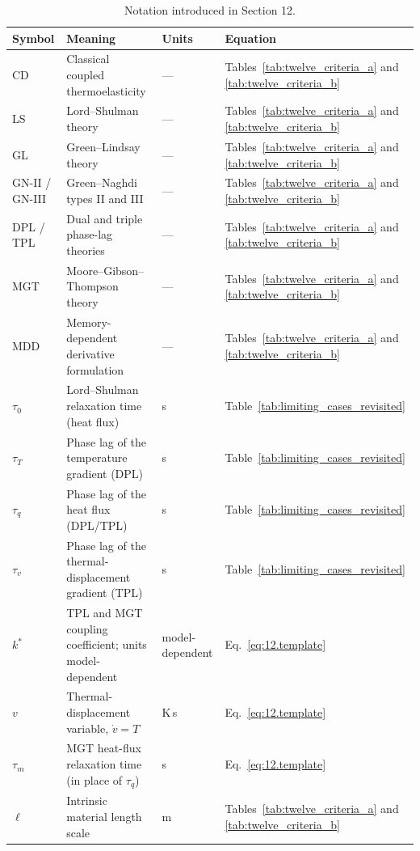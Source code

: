 \begin{table}[htbp]
\centering
\small
\caption{Notation introduced in Section 12.}
\label{tab:notation-sec12}
\begin{tabularx}{\textwidth}{@{}>{\raggedright\arraybackslash}p{1.8cm}X>{\raggedright\arraybackslash}p{2.2cm}>{\raggedright\arraybackslash}p{2.1cm}@{}}
\toprule
\textbf{Symbol} & \textbf{Meaning} & \textbf{Units} & \textbf{Equation} \\
\midrule
CD & Classical coupled thermoelasticity & --- & Tables~\ref{tab:twelve_criteria_a} and \ref{tab:twelve_criteria_b} \\
LS & Lord--Shulman theory & --- & Tables~\ref{tab:twelve_criteria_a} and \ref{tab:twelve_criteria_b} \\
GL & Green--Lindsay theory & --- & Tables~\ref{tab:twelve_criteria_a} and \ref{tab:twelve_criteria_b} \\
GN-II / GN-III & Green--Naghdi types II and III & --- & Tables~\ref{tab:twelve_criteria_a} and \ref{tab:twelve_criteria_b} \\
DPL / TPL & Dual and triple phase-lag theories & --- & Tables~\ref{tab:twelve_criteria_a} and \ref{tab:twelve_criteria_b} \\
MGT & Moore--Gibson--Thompson theory & --- & Tables~\ref{tab:twelve_criteria_a} and \ref{tab:twelve_criteria_b} \\
MDD & Memory-dependent derivative formulation & --- & Tables~\ref{tab:twelve_criteria_a} and \ref{tab:twelve_criteria_b} \\
$\tau_0$ & Lord--Shulman relaxation time (heat flux) & s & Table~\ref{tab:limiting_cases_revisited} \\
$\tau_T$ & Phase lag of the temperature gradient (DPL) & s & Table~\ref{tab:limiting_cases_revisited} \\
$\tau_q$ & Phase lag of the heat flux (DPL/TPL) & s & Table~\ref{tab:limiting_cases_revisited} \\
$\tau_v$ & Phase lag of the thermal-displacement gradient (TPL) & s & Table~\ref{tab:limiting_cases_revisited} \\
$k^*$ & TPL and MGT coupling coefficient; units model-dependent & model-dependent & Eq.~\eqref{eq:12.template} \\
$v$ & Thermal-displacement variable, $\dot v=T$ & K\,s & Eq.~\eqref{eq:12.template} \\
$\tau_m$ & MGT heat-flux relaxation time (in place of $\tau_q$) & s & Eq.~\eqref{eq:12.template} \\
$\ell$ & Intrinsic material length scale & m & Tables~\ref{tab:twelve_criteria_a} and \ref{tab:twelve_criteria_b} \\
\bottomrule
\end{tabularx}
\end{table}

